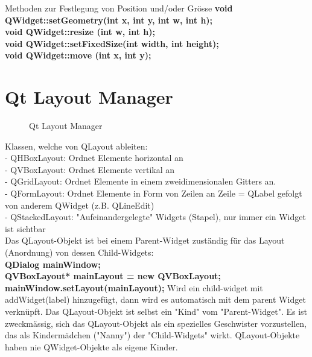 Methoden zur Festlegung von Position und/oder Grösse
\textbf{void QWidget::setGeometry(int x, int y, int w, int h);} \\
\textbf{void QWidget::resize (int w, int h);} \\
\textbf{void QWidget::setFixedSize(int width, int height);} \\
\textbf{void QWidget::move (int x, int y);} \\

\section{Qt Layout Manager}
\begin{figure}[ht]
	\centering
	\caption[]{Qt Layout Manager}
\end{figure}

Klassen, welche von QLayout ableiten: \\
- QHBoxLayout: Ordnet Elemente horizontal  an \\
- QVBoxLayout: Ordnet Elemente vertikal an \\
- QGridLayout: Ordnet Elemente in einem zweidimensionalen Gitters an. \\
- QFormLayout: Ordnet Elemente in Form von Zeilen an Zeile = QLabel gefolgt von anderem QWidget (z.B. QLineEdit) \\
- QStackedLayout: "Aufeinandergelegte" Widgets (Stapel), nur immer ein Widget ist sichtbar \\
 

Das QLayout-Objekt ist bei einem Parent-Widget zuständig für das Layout (Anordnung) von dessen Child-Widgets:  \\
\textbf{QDialog mainWindow;} \\
\textbf{QVBoxLayout* mainLayout = new QVBoxLayout;} \\
\textbf{mainWindow.setLayout(mainLayout);}
Wird ein child-widget mit addWidget(label) hinzugefügt, dann wird es automatisch mit dem parent Widget verknüpft. 
Das QLayout-Objekt ist selbst ein "Kind" vom "Parent-Widget". Es ist zweckmässig, sich das QLayout-Objekt als ein spezielles Geschwister vorzustellen, das als Kindermädchen ("Nanny") der "Child-Widgets" wirkt. QLayout-Objekte haben nie QWidget-Objekte als eigene Kinder.

